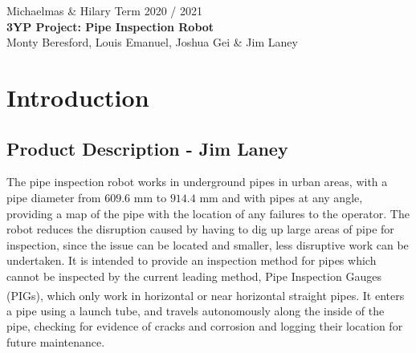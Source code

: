 \documentclass[11pt]{article}		%
\begin{document}
	
	\flushleft
	\raggedright

	\begin{center}
		\vspace*{2cm}
		Michaelmas \& Hilary Term 2020 / 2021\\ %
		\vspace*{6cm}
		\huge{\textbf{3YP Project: Pipe Inspection Robot}}\\ 
		\vspace*{6cm}
		\large{Monty Beresford, Louis Emanuel, Joshua Gei \& Jim Laney} %
		\thispagestyle{empty} %
	\end{center}

	\newpage
	
	\tableofcontents
	\thispagestyle{empty} %
	\newpage

	\setcounter{page}{1}
	
	\section{Introduction}
	
	\subsection[Product Description]{Product Description - Jim Laney}
	The pipe inspection robot works in underground pipes in urban areas, with a pipe diameter from $609.6$ mm to $914.4$ mm and with pipes at any angle, providing a map of the pipe with the location of any failures to the operator. %
	The robot reduces the disruption caused by having to dig up large areas of pipe for inspection, since the issue can be located and smaller, less disruptive work can be undertaken.
	It is intended to provide an inspection method for pipes which cannot be inspected by the current leading method, Pipe Inspection Gauges (PIGs), which only work in horizontal or near horizontal straight pipes\textsuperscript{\cite{mills2017advances}}.
	It enters a pipe using a launch tube, and travels autonomously along the inside of the pipe, checking for evidence of cracks and corrosion and logging their location for future maintenance.
	\\
	
\end{document}
